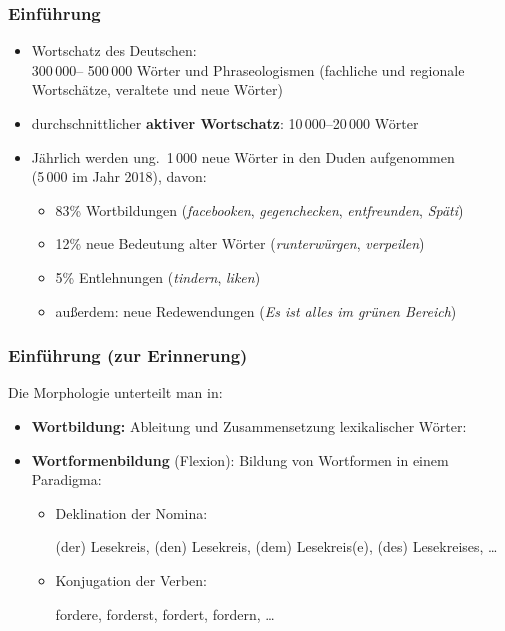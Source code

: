 \begin{frame}
\frametitle{Einführung}

\begin{itemize}
	\item Wortschatz des Deutschen: \\
300\,000– 500\,000 Wörter und Phraseologismen (fachliche und regionale Wortschätze, veraltete und neue Wörter)

	\item durchschnittlicher \textbf{aktiver Wortschatz}:
10\,000–20\,000 Wörter

	\item Jährlich werden ung.\ 1\,000 neue Wörter in den Duden aufgenommen \\
	(5\,000 im Jahr 2018), davon:
	
	\begin{itemize}
		\item 83\% Wortbildungen (\zB \emph{facebooken}, \emph{gegenchecken}, \emph{entfreunden}, \emph{Späti})
		\item 12\% neue Bedeutung alter Wörter (\zB \emph{runterwürgen}, \emph{verpeilen})
		\item 5\% Entlehnungen (\zB \emph{tindern}, \emph{liken})
		\item außerdem: neue Redewendungen (\zB \emph{Es ist alles im grünen Bereich})
	\end{itemize}
\end{itemize}

\end{frame}


\begin{frame}
\frametitle{Einführung (zur Erinnerung)}

Die Morphologie unterteilt man in:
	
	\begin{itemize}
		\item \textbf{Wortbildung:} Ableitung und Zusammensetzung lexikalischer Wörter:
		
		\eal 
		\zl
		
		\item \textbf{Wortformenbildung} (Flexion): Bildung von Wortformen in einem Paradigma: 
		
		\begin{itemize}
			\item Deklination der Nomina: 
			
			\ea (der) Lesekreis, (den) Lesekreis, (dem) Lesekreis(e), (des) Lesekreises, \ldots
			\z 
			
			\item Konjugation der Verben: 
			
			\ea fordere, forderst, fordert, fordern, \ldots 
			\z 
		\end{itemize}	
	\end{itemize}	

\end{frame}


